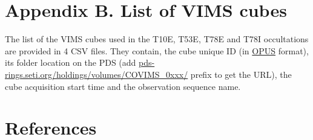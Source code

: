 \documentclass{arxiv-icarus}
\begin{document}
\section*{Appendix B. List of VIMS cubes}

The list of the VIMS cubes used in the T10E, T53E, T78E and T78I occultations are provided in 4 CSV files.
They contain, the cube unique ID (in \href{https://tools.pds-rings.seti.org/opus/}{OPUS} format), its folder location on the PDS (add \href{https://pds-rings.seti.org/holdings/volumes/COVIMS_0xxx/}{pds-rings.seti.org/holdings/volumes/COVIMS\_0xxx/} prefix to get the URL), the cube acquisition start time and the observation sequence name.


\section*{References}

\end{document}
